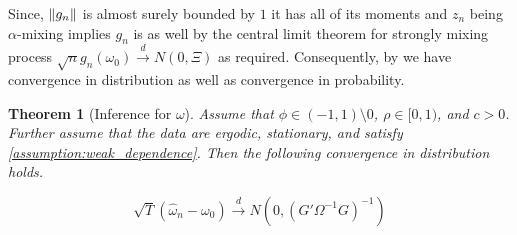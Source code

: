 \documentclass[11pt]{article}
\newtheorem{Theorem}{Theorem}[section]
\newcommand*{\N}{N}
\newcommand*{\dto}{\stackrel{d}{\to}}
\DeclarePairedDelimiter\norm{\lVert}{\rVert}
\begin{document}
Since, $\norm*{g_n}$ is almost surely bounded by $1$ it has all of its moments and $z_n$ being $\alpha$-mixing
implies $g_n$ is as well by the central limit theorem for strongly mixing process 
$\sqrt{n} g_n(\omega_0) \dto \N(0,\Xi)$ as required. 
Consequently, by \textcite[Theorem 3.2]{newey1994large} we have convergence in distribution as well as convergence
in probability.

\begin{Theorem}[Inference for $\omega$]
    Assume that $\phi  \in (-1,1) \setminus 0$, $\rho \in [0,1)$, and $c > 0$. 
    Further assume that the data are ergodic, stationary, and satisfy \cref{assumption:weak_dependence}.
    Then the following convergence in distribution holds.

    \begin{equation}
        \sqrt{T} (\widehat{\omega}_n - \omega_{0}) \dto \N\left(0, \left(G' \Omega^{-1} G\right)^{-1}\right)
    \end{equation}
\end{Theorem}


\printbibliography
\end{document}
